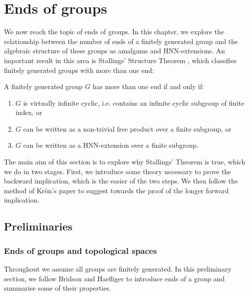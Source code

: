 \section{Ends of groups} \label{Ends of groups} %


We now reach the topic of ends of groups. In this chapter, we explore the relationship between the number of ends of a finitely generated group and the algebraic structure of these groups as amalgams and HNN-extensions. An important result in this area is Stallings’ Structure Theorem \cite[p.~4]{S71}, which classifies finitely generated groups with more than one end:

\begin{theorem} 
\label{thm:SST}
A finitely generated group \(G\) has more than one end if and only if:
    \begin{enumerate}
        \item \(G\) is virtually infinite cyclic, i.e. contains an infinite cyclic subgroup of finite index, or
        \item \(G\) can be written as a non-trivial free product over a finite subgroup, or
        \item \(G\) can be written as a HNN-extension over a finite subgroup. 
    \end{enumerate}
\end{theorem}

The main aim of this section is to explore why Stallings' Theorem is true, which we do in two stages. First, we introduce some theory necessary to prove the backward implication, which is the easier of the two steps. We then follow the method of Kr{\"o}n's paper \cite{K10} to suggest towards the proof of the longer forward implication. 

\subsection{Preliminaries}
\subsubsection{Ends of groups and topological spaces}
Throughout we assume all groups are finitely generated. In this preliminary section, we follow Bridson and Haefliger \cite[p.~144--148]{BrHa11} to introduce ends of a group and summarise some of their properties. 

